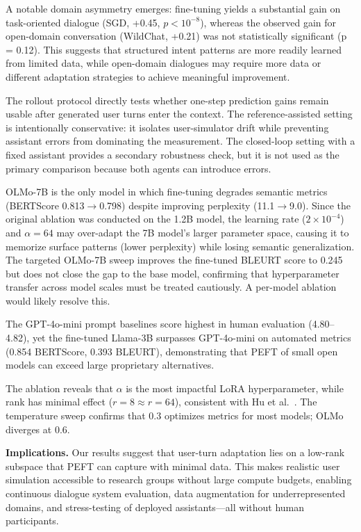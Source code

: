 \documentclass[conference]{IEEEtran}
\begin{document}
A notable domain asymmetry emerges: fine-tuning yields a substantial gain on task-oriented dialogue (SGD, +0.45, $p < 10^{-8}$), whereas the observed gain for open-domain conversation (WildChat, +0.21) was not statistically significant (p = 0.12). This suggests that structured intent patterns are more readily learned from limited data, while open-domain dialogues may require more data or different adaptation strategies to achieve meaningful improvement.

The rollout protocol directly tests whether one-step prediction gains remain usable after generated user turns enter the context. The reference-assisted setting is intentionally conservative: it isolates user-simulator drift while preventing assistant errors from dominating the measurement. The closed-loop setting with a fixed assistant provides a secondary robustness check, but it is not used as the primary comparison because both agents can introduce errors.


OLMo-7B is the only model in which fine-tuning degrades semantic metrics (BERTScore 0.813$\to$0.798) despite improving perplexity (11.1$\to$9.0). Since the original ablation was conducted on the 1.2B model, the learning rate ($2{\times}10^{-4}$) and $\alpha{=}64$ may over-adapt the 7B model's larger parameter space, causing it to memorize surface patterns (lower perplexity) while losing semantic generalization. The targeted OLMo-7B sweep improves the fine-tuned BLEURT score to 0.245 but does not close the gap to the base model, confirming that hyperparameter transfer across model scales must be treated cautiously. A per-model ablation would likely resolve this.

The GPT-4o-mini prompt baselines score highest in human evaluation (4.80--4.82), yet the fine-tuned Llama-3B surpasses GPT-4o-mini on automated metrics (0.854 BERTScore, 0.393 BLEURT), demonstrating that PEFT of small open models can exceed large proprietary alternatives.

The ablation reveals that $\alpha$ is the most impactful LoRA hyperparameter, while rank has minimal effect ($r{=}8 \approx r{=}64$), consistent with Hu et al.~\cite{hu2021lora}. The temperature sweep confirms that 0.3 optimizes metrics for most models; OLMo diverges at 0.6.

\textbf{Implications.} Our results suggest that user-turn adaptation lies on a low-rank subspace that PEFT can capture with minimal data. This makes realistic user simulation accessible to research groups without large compute budgets, enabling continuous dialogue system evaluation, data augmentation for underrepresented domains, and stress-testing of deployed assistants---all without human participants.
\end{document}
